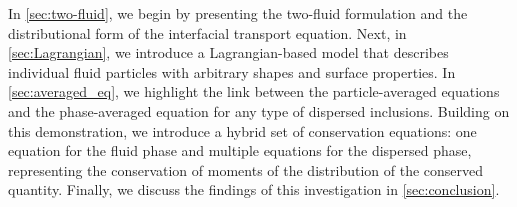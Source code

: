 In \ref{sec:two-fluid}, we begin by presenting the two-fluid formulation and the distributional form of the interfacial transport equation. 
Next, in \ref{sec:Lagrangian}, we introduce a Lagrangian-based model that describes individual fluid particles with arbitrary shapes and surface properties. 
In \ref{sec:averaged_eq}, we highlight the link between the particle-averaged equations and the phase-averaged equation for any type of dispersed inclusions. 
Building on this demonstration, we introduce a hybrid set of conservation equations: one equation for the fluid phase and multiple equations for the dispersed phase, representing the conservation of moments of the distribution of the conserved quantity. 
Finally, we discuss the findings of this investigation in \ref{sec:conclusion}.



